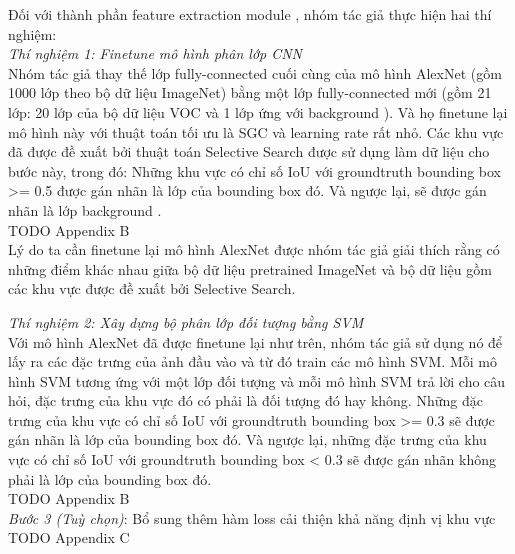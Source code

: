 {    \noindent
    Đối với thành phần feature extraction module , nhóm tác giả thực hiện hai thí nghiệm: \\
    \textit{Thí nghiệm 1: Finetune mô hình phân lớp CNN} \\
    Nhóm tác giả thay thế lớp fully-connected cuối cùng của mô hình AlexNet (gồm 1000 lớp theo bộ dữ liệu ImageNet) bằng một lớp fully-connected mới (gồm 21 lớp: 20 lớp của bộ dữ liệu VOC và 1 lớp ứng với background ).
    Và họ finetune lại mô hình này với thuật toán tối ưu là SGC và learning rate rất nhỏ.
    Các khu vực đã được đề xuất bởi thuật toán Selective Search được sử dụng làm dữ liệu cho bước này, trong đó:
    Những khu vực có chỉ số IoU  với groundtruth  bounding box  >= 0.5 được gán nhãn là lớp của bounding box  đó.
    Và ngược lại, sẽ được gán nhãn là lớp background . \\
    TODO Appendix B \\
    Lý do ta cần finetune lại mô hình AlexNet được nhóm tác giả giải thích rằng có những điểm khác nhau giữa bộ dữ liệu pretrained ImageNet và bộ dữ liệu gồm các khu vực được đề xuất bởi Selective Search.

    \noindent
    \textit{Thí nghiệm 2: Xây dựng bộ phân lớp đối tượng  bằng SVM} \\
    Với mô hình AlexNet đã được finetune lại như trên, nhóm tác giả sử dụng nó để lấy ra các đặc trưng của ảnh đầu vào và từ đó train các mô hình SVM.
    Mỗi mô hình SVM tương ứng với một lớp đối tượng  và mỗi mô hình SVM trả lời cho câu hỏi, đặc trưng của khu vực đó có phải là đối tượng đó hay không.
    Những đặc trưng của khu vực có chỉ số IoU  với groundtruth  bounding box  >= 0.3 sẽ được gán nhãn là lớp của bounding box  đó.
    Và ngược lại, những đặc trưng của khu vực có chỉ số IoU  với groundtruth  bounding box  < 0.3 sẽ được gán nhãn không phải là lớp của bounding box  đó. \\
    TODO Appendix B \\

    \textit{Bước 3 (Tuỳ chọn)}: Bổ sung thêm hàm loss cải thiện khả năng định vị khu vực \\
    TODO Appendix C \\

}
